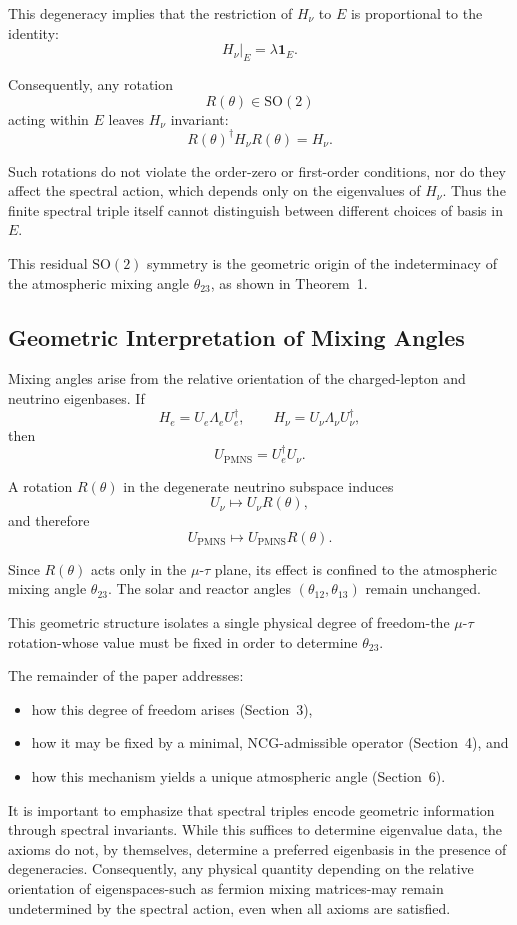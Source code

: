 This degeneracy implies that the restriction of $H_\nu$ to $E$ is proportional to the identity:
\[
H_\nu|_E = \lambda \mathbf 1_E.
\]

Consequently, any rotation
\[
R(\theta)\in \mathrm{SO}(2)
\]
acting within $E$ leaves $H_\nu$ invariant:
\[
R(\theta)^\dagger H_\nu R(\theta) = H_\nu.
\]

Such rotations do not violate the order-zero or first-order conditions, nor do they affect the spectral action, which depends only on the eigenvalues of $H_\nu$. Thus the finite spectral triple itself cannot distinguish between different choices of basis in $E$.

This residual $\mathrm{SO}(2)$ symmetry is the geometric origin of the indeterminacy of the atmospheric mixing angle $\theta_{23}$, as shown in Theorem~1.

\subsection{Geometric Interpretation of Mixing Angles}

Mixing angles arise from the relative orientation of the charged-lepton and neutrino eigenbases. If
\[
H_e = U_e \Lambda_e U_e^\dagger,\qquad
H_\nu = U_\nu \Lambda_\nu U_\nu^\dagger,
\]
then
\[
U_{\mathrm{PMNS}} = U_e^\dagger U_\nu.
\]

A rotation $R(\theta)$ in the degenerate neutrino subspace induces
\[
U_\nu \longmapsto U_\nu R(\theta),
\]
and therefore
\[
U_{\mathrm{PMNS}} \longmapsto U_{\mathrm{PMNS}} R(\theta).
\]

Since $R(\theta)$ acts only in the $\mu$-$\tau$ plane, its effect is confined to the atmospheric mixing angle $\theta_{23}$. The solar and reactor angles $(\theta_{12},\theta_{13})$ remain unchanged.

This geometric structure isolates a single physical degree of freedom-the $\mu$-$\tau$ rotation-whose value must be fixed in order to determine $\theta_{23}$.

The remainder of the paper addresses:
\begin{itemize}
\item how this degree of freedom arises (Section~3),
\item how it may be fixed by a minimal, NCG-admissible operator (Section~4), and
\item how this mechanism yields a unique atmospheric angle (Section~6).
\end{itemize}

It is important to emphasize that spectral triples encode geometric information through spectral invariants. While this suffices to determine eigenvalue data, the axioms do not, by themselves, determine a preferred eigenbasis in the presence of degeneracies. Consequently, any physical quantity depending on the relative orientation of eigenspaces-such as fermion mixing matrices-may remain undetermined by the spectral action, even when all axioms are satisfied.

